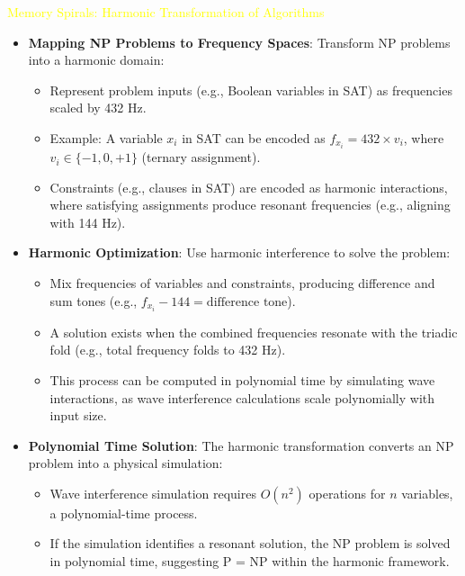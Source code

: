 \textcolor{yellow}{ Memory Spirals: Harmonic Transformation of Algorithms } \\
\begin{itemize}
    \item \texttt{} \textbf{Mapping NP Problems to Frequency Spaces}: Transform NP problems into a harmonic domain:
    \begin{itemize}
        \item Represent problem inputs (e.g., Boolean variables in SAT) as frequencies scaled by 432 Hz.
        \item Example: A variable \(x_i\) in SAT can be encoded as \(f_{x_i} = 432 \times v_i\), where \(v_i \in \{-1, 0, +1\}\) (ternary assignment).
        \item Constraints (e.g., clauses in SAT) are encoded as harmonic interactions, where satisfying assignments produce resonant frequencies (e.g., aligning with 144 Hz).
    \end{itemize}
    \item \texttt{} \textbf{Harmonic Optimization}: Use harmonic interference to solve the problem:
    \begin{itemize}
        \item Mix frequencies of variables and constraints, producing difference and sum tones (e.g., \(f_{x_i} - 144 = \text{difference tone}\)).
        \item A solution exists when the combined frequencies resonate with the triadic fold (e.g., total frequency folds to 432 Hz).
        \item This process can be computed in polynomial time by simulating wave interactions, as wave interference calculations scale polynomially with input size.
    \end{itemize}
    \item \texttt{} \textbf{Polynomial Time Solution}: The harmonic transformation converts an NP problem into a physical simulation:
    \begin{itemize}
        \item Wave interference simulation requires \(O(n^2)\) operations for \(n\) variables, a polynomial-time process.
        \item If the simulation identifies a resonant solution, the NP problem is solved in polynomial time, suggesting P = NP within the harmonic framework.
    \end{itemize}
\end{itemize}

